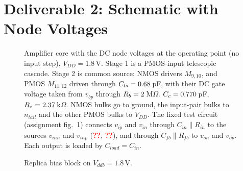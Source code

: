 \documentclass[11pt,a4paper]{article}
\providecommand{\opV}[1]{\textcolor{red}{\textbf{??}}}\providecommand{\opI}[1]{\textcolor{red}{\textbf{??}}}}
\begin{document}
\section*{Deliverable 2: Schematic with Node Voltages}
\showIfalse
\begin{figure}[H]\centering
\resizebox{\linewidth}{!}{}
\caption{Amplifier core with the DC node voltages at the operating point (no input step), $V_{DD} = 1.8$\,V. Stage 1
is a PMOS-input telescopic cascode. Stage 2 is common source: NMOS drivers $M_{9,10}$, and PMOS $M_{11,12}$ driven
through $C_{ls} = 0.68$\,pF, with their DC gate voltage taken from $v_{bp}$ through $R_b = 2$\,M$\Omega$.
$C_c = 0.770$\,pF, $R_z = 2.37$\,k$\Omega$. NMOS bulks go to ground, the input-pair bulks to $n_{tail}$ and the other PMOS
bulks to $V_{DD}$. The fixed test circuit (assignment fig.~1) connects $v_{ip}$ and $v_{in}$ through
$C_{in} \parallel R_{in}$ to the sources $v_{inn}$ and $v_{inp}$ (\opV{inn}, \opV{inp}), and through
$C_{fb} \parallel R_{fb}$ to $v_{on}$ and $v_{op}$. Each output is loaded by $C_{load} = C_{in}$.}
\end{figure}
\vspace{-4mm}
\begin{figure}[H]\centering
\begin{minipage}[b]{0.46\linewidth}\centering
\resizebox{\linewidth}{!}{}
\caption{CMFB (on $V_{DD}$) with node voltages.}
\end{minipage}\hfill
\begin{minipage}[b]{0.52\linewidth}\centering
\resizebox{\linewidth}{!}{}
\caption{Replica bias block on $V_{ddb} = 1.8$\,V.}
\end{minipage}
\end{figure}
\clearpage

\end{document}
